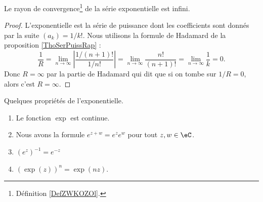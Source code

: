 \begin{proposition}     \label{PROPooXEYFooIEaPvU}
	Le rayon de convergence\footnote{Définition \ref{DefZWKOZOl}.} de la série exponentielle est infini.
\end{proposition}

\begin{proof}
	L'exponentielle est la série de puissance dont les coefficients sont donnés par la suite \( (a_k)=1/k!\). Nous utilisons la formule de Hadamard de la proposition \ref{ThoSerPuissRap} :
	\begin{equation}
		\frac{1}{ R }=\lim_{n\to \infty} \left| \frac{ 1/(n+1)! }{ 1/n! } \right| =\lim_{n\to \infty}\frac{ n! }{ (n+1)! }=\lim_{n\to\infty}\frac{ 1 }{ k }=0.
	\end{equation}
	Donc \( R=\infty\) par la partie de Hadamard qui dit que si on tombe sur \( 1/R=0\), alors c'est \( R=\infty\).
\end{proof}


\begin{proposition}     \label{PropdDjisy}
	Quelques propriétés de l'exponentielle.
	\begin{enumerate}
		\item
		      Le fonction \( \exp\) est continue.
		\item       \label{ITEMooRLHCooJTuYKV}
		      Nous avons la formule \(  e^{z+w}= e^{z}e^w\) pour tout \( z,w\in \eC\).
		\item
		      \( (e^z)^{-1}= e^{-z}\)
		\item       \label{ITEMooIFYFooUniuKS}
		      \( (\exp(z))^n=\exp(nz)\).
	\end{enumerate}
\end{proposition}

